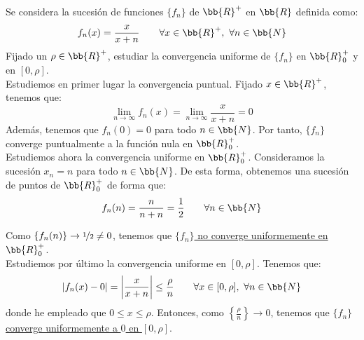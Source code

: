\begin{ejercicio}
    Se considera la sucesión de funciones $\{f_n\}$ de $\bb{R}^+$ en $\bb{R}$ definida como:
    \begin{equation*}
        f_n(x) = \frac{x}{x+n} \qquad \forall x\in \bb{R}^+,~\forall n\in \bb{N}
    \end{equation*}
    Fijado un $\rho\in \bb{R}^+$, estudiar la convergencia uniforme de $\{f_n\}$ en $\bb{R}_0^+$ y en $[0,\rho]$.\\

    Estudiemos en primer lugar la convergencia puntual. Fijado $x\in \bb{R}^+$, tenemos que:
    \begin{equation*}
        \lim_{n\to \infty} f_n(x) = \lim_{n\to \infty} \frac{x}{x+n} = 0
    \end{equation*}
    Además, tenemos que $f_n(0)=0$ para todo $n\in \bb{N}$. Por tanto, $\{f_n\}$ converge puntualmente a la función nula en $\bb{R}^+_0$.\\
    
    Estudiemos ahora la convergencia uniforme en $\bb{R}^+_0$. Consideramos la sucesión $x_n=n$ para todo $n\in \bb{N}$. De esta forma, obtenemos una sucesión de puntos de $\bb{R}^+_0$ de forma que:
    \begin{equation*}
        f_n(n) = \frac{n}{n+n} = \frac{1}{2} \qquad \forall n\in \bb{N}
    \end{equation*}

    Como $\{f_n(n)\}\to \nicefrac{1}{2}\neq 0$, tenemos que \ul{$\{f_n\}$ no converge uniformemente en $\bb{R}^+_0$}.\\

    Estudiemos por último la convergencia uniforme en $[0,\rho]$. Tenemos que:
    \begin{equation*}
        \left|f_n(x)-0\right| = \left|\frac{x}{x+n}\right| \leq \frac{\rho}{n} \qquad \forall x\in [0,\rho],~\forall n\in \bb{N}
    \end{equation*}
    donde he empleado que $0\leq x\leq \rho$. Entonces, como $\left\{\frac{\rho}{n}\right\}\to 0$, tenemos que \ul{$\{f_n\}$ converge uniformemente a $0$ en $[0,\rho]$}.
\end{ejercicio}
